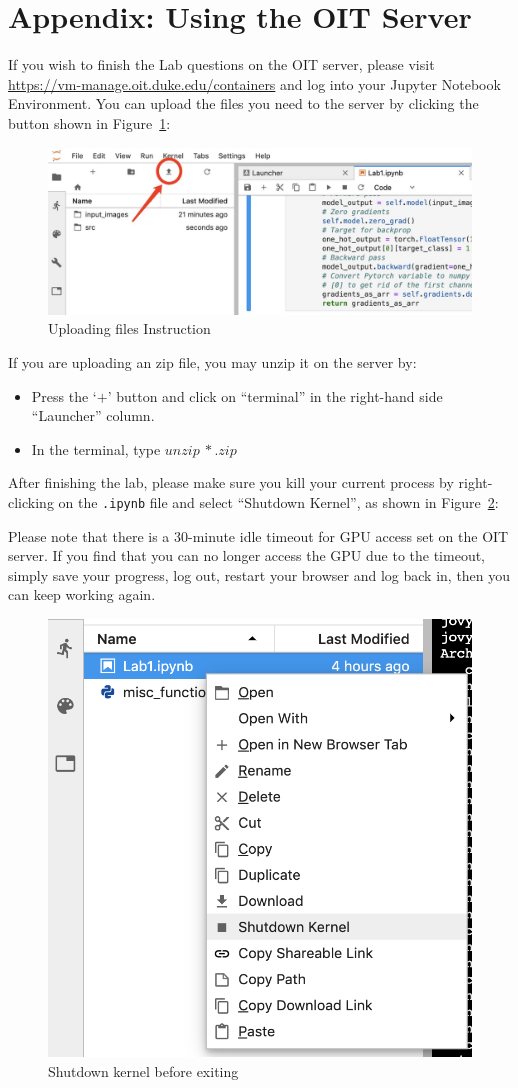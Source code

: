 \section*{Appendix: Using the OIT Server}
If you wish to finish the Lab questions on the OIT server, please visit \url{https://vm-manage.oit.duke.edu/containers} and log into your Jupyter Notebook Environment. You can upload the files you need to the server by clicking the button shown in Figure~\ref{fig:upload}:
\begin{figure}[h]
\centering
  \includegraphics[width=0.8\linewidth]{upload_ins.jpg}
  \caption{Uploading files Instruction}
  \label{fig:upload}
\end{figure}

If you are uploading an zip file, you may unzip it on the server by:
\begin{itemize}
    \item Press the `$+$' button and click on ``terminal'' in the right-hand side ``Launcher'' column.
    \item In the terminal, type $unzip\ *.zip$
\end{itemize}

\begin{warn}[Notice:]
After finishing the lab, please make sure you kill your current process by right-clicking on the \texttt{.ipynb} file and select ``Shutdown Kernel'', as shown in Figure~\ref{fig:shutdown}:

Please note that there is a 30-minute idle timeout for GPU access set on the OIT server. If you find that you can no longer access the GPU due to the timeout, simply save your progress, log out, restart your browser and log back in, then you can keep working again.
\end{warn}

\begin{figure}[h]
\centering
  \includegraphics[width=0.3\linewidth]{shutdown.png}
  \caption{Shutdown kernel before exiting}
  \label{fig:shutdown}
\end{figure}
